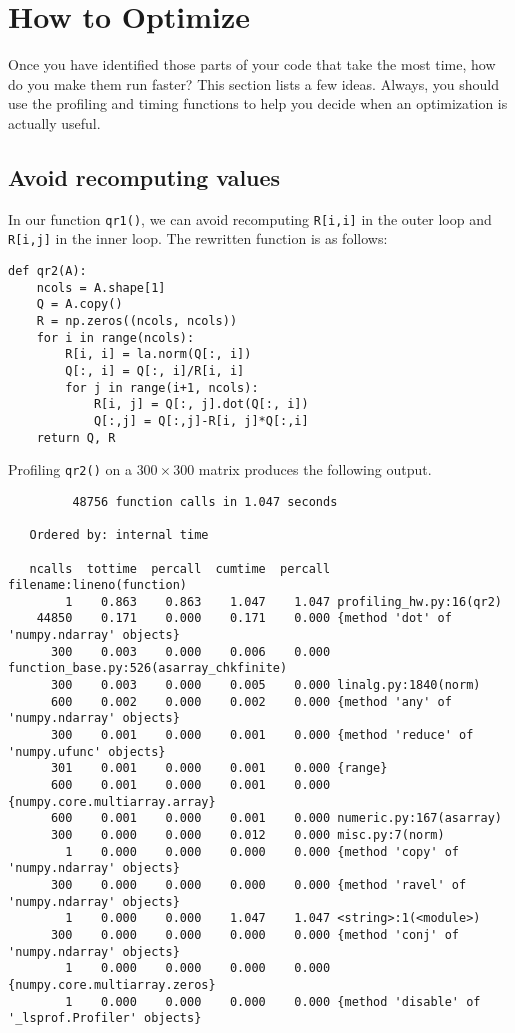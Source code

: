 \section*{How to Optimize}
Once you have identified those parts of your code that take the most time, how do you make them run faster?
This section lists a few ideas.
Always, you should use the profiling and timing functions to help you decide when an optimization is actually useful.

\subsection*{Avoid recomputing values}
In our function \texttt{qr1()}, we can avoid recomputing \texttt{R[i,i]} in the outer loop and \texttt{R[i,j]} in the inner loop.
The rewritten function is as follows:
\begin{lstlisting}
def qr2(A):
    ncols = A.shape[1]
    Q = A.copy()
    R = np.zeros((ncols, ncols))
    for i in range(ncols):
        R[i, i] = la.norm(Q[:, i])
        Q[:, i] = Q[:, i]/R[i, i]
        for j in range(i+1, ncols):
            R[i, j] = Q[:, j].dot(Q[:, i])
            Q[:,j] = Q[:,j]-R[i, j]*Q[:,i]
    return Q, R
\end{lstlisting}

Profiling \texttt{qr2()} on a $300 \times 300$ matrix produces the following output.

{\scriptsize
\begin{verbatim}
         48756 function calls in 1.047 seconds

   Ordered by: internal time

   ncalls  tottime  percall  cumtime  percall filename:lineno(function)
        1    0.863    0.863    1.047    1.047 profiling_hw.py:16(qr2)
    44850    0.171    0.000    0.171    0.000 {method 'dot' of 'numpy.ndarray' objects}
      300    0.003    0.000    0.006    0.000 function_base.py:526(asarray_chkfinite)
      300    0.003    0.000    0.005    0.000 linalg.py:1840(norm)
      600    0.002    0.000    0.002    0.000 {method 'any' of 'numpy.ndarray' objects}
      300    0.001    0.000    0.001    0.000 {method 'reduce' of 'numpy.ufunc' objects}
      301    0.001    0.000    0.001    0.000 {range}
      600    0.001    0.000    0.001    0.000 {numpy.core.multiarray.array}
      600    0.001    0.000    0.001    0.000 numeric.py:167(asarray)
      300    0.000    0.000    0.012    0.000 misc.py:7(norm)
        1    0.000    0.000    0.000    0.000 {method 'copy' of 'numpy.ndarray' objects}
      300    0.000    0.000    0.000    0.000 {method 'ravel' of 'numpy.ndarray' objects}
        1    0.000    0.000    1.047    1.047 <string>:1(<module>)
      300    0.000    0.000    0.000    0.000 {method 'conj' of 'numpy.ndarray' objects}
        1    0.000    0.000    0.000    0.000 {numpy.core.multiarray.zeros}
        1    0.000    0.000    0.000    0.000 {method 'disable' of '_lsprof.Profiler' objects}
\end{verbatim}
}

